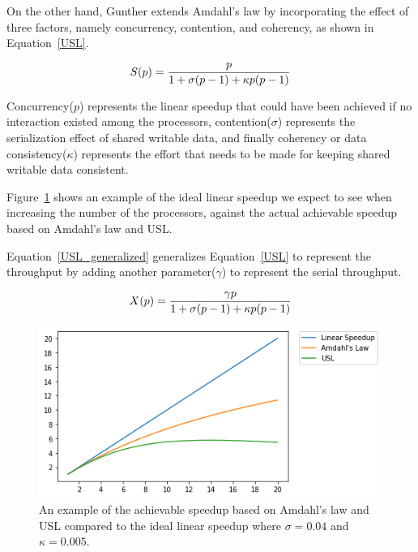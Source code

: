 On the other hand, Gunther\cite{gunther2007guerrilla} extends Amdahl's law by incorporating the effect of three factors, namely concurrency, contention, and coherency, as shown in Equation~\ref{USL}.

\begin{equation}\label{USL}
S(p) = \frac{p}{1+\sigma(p-1)+\kappa{p}(p-1)}\\
\end{equation}

Concurrency($p$) represents the linear speedup that could have been achieved if no interaction existed among the processors, contention($\sigma$) represents the serialization effect of shared writable data, and finally coherency or data consistency($\kappa$) represents the effort that needs to be made for keeping shared writable data consistent\cite{gunther2007guerrilla}.    

Figure~\ref{fig_Amdahl} shows an example of the ideal linear speedup we expect to see when increasing the number of the processors, against the actual achievable speedup based on Amdahl's law and USL.

Equation~\ref{USL_generalized} generalizes Equation~\ref{USL} to represent the throughput by adding another parameter($\gamma$) to represent the serial throughput.

\begin{equation}\label{USL_generalized}
X(p) = \frac{\gamma{p}}{1+\sigma(p-1)+\kappa{p}(p-1)}\\
\end{equation}

\begin{figure}[H]
	\centering
	\includegraphics[scale=0.8]{images/Amdahls.png}
	\caption{An example of the achievable speedup based on Amdahl's law and USL compared to the ideal linear speedup where $\sigma=0.04$ and $\kappa=0.005$.}	
	\label{fig_Amdahl}
\end{figure}

